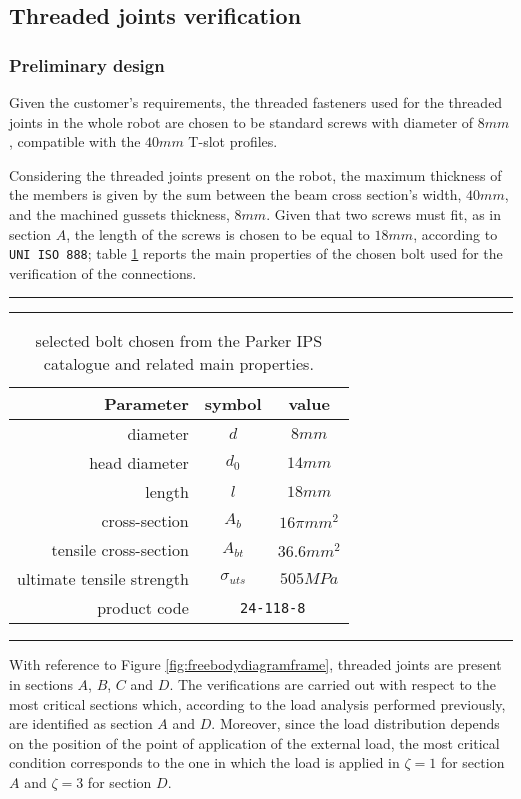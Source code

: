 \subsection{Threaded joints verification}
\subsubsection*{Preliminary design}
Given the customer's requirements, the threaded fasteners used for the threaded joints in the whole robot are chosen to be standard screws with diameter of $8mm$, compatible with the $40mm$ T-slot profiles.

Considering the threaded joints present on the robot, the maximum thickness of the members is given by the sum between the beam cross section's width, $40 mm$, and the machined gussets thickness, $8 mm$. Given that two screws must fit, as in section $A$, the length of the screws is chosen to be equal to $18 mm$, according to \texttt{UNI ISO 888}; table \ref{tab:boltchoise} reports the main properties of the chosen bolt used for the verification of the connections.

\begin{table}[h!]
	\rule{\linewidth}{2pt}
	\caption{selected bolt chosen from the Parker IPS catalogue \cite{parker-ds} and related main properties.}
	\label{tab:boltchoise}
	\rule{\linewidth}{1pt} 
	\begin{center}
	\begin{tabular}{r c c}
		Parameter & symbol & value \\ \hline
		diameter & $d$ & $8mm$ \\
		head diameter & $d_0$ & $14mm$ \\
		length & $l$ & $18mm$ \\
		cross-section & $A_b$ & $16\pi mm^2$ \\
		tensile cross-section & $A_{bt}$ & $36.6mm^2$ \\
		ultimate tensile strength & $\sigma_{uts}$ & $505MPa$ \\
		product code & \multicolumn{2}{c}{\texttt{24-118-8}}
	\end{tabular}
	\end{center}
	\rule{\linewidth}{2pt}
\end{table}

With reference to Figure \ref{fig:freebodydiagramframe}, threaded joints are present in sections $A$, $B$, $C$ and $D$. The verifications are carried out with respect to the most critical sections which, according to the load analysis performed previously, are identified as section $A$ and $D$. Moreover, since the load distribution depends on the position of the point of application of the external load, the most critical condition corresponds to the one in which the load is applied in $\zeta = 1$ for section $A$ and $\zeta = 3$ for section $D$.\\
